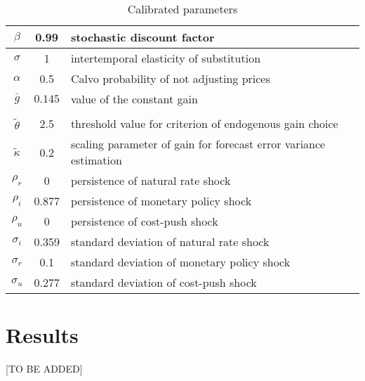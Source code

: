 \documentclass[11pt]{article}
\renewcommand{\[}{\begin{equation}}
\renewcommand{\]}{\end{equation}}
\begin{document}
\begin{center}
\begin{table}
\begin{tabular}{ c | c  | l }
 $\beta$ & 0.99 & stochastic discount factor \\  \hline
 $\sigma$ & 1  & intertemporal elasticity of substitution \\  \hline
 $\alpha$ & 0.5 &  Calvo probability of not adjusting prices \\\hline
 $\bar{g}$ & $0.145$  & value of the constant gain \\\hline
& & \\ [-1em] %
 $\tilde{\theta}$ &  2.5  & threshold value for criterion of endogenous gain choice \\ \hline
  $\tilde{\kappa}$ &  0.2  & scaling parameter of gain for forecast error variance estimation \\ \hline
    $\rho_r$ & 0 &   persistence of natural rate shock \\ \hline
    $\rho_i$ & 0.877 &  persistence of monetary policy shock  \\ \hline
    $\rho_u$ & 0  &  persistence of cost-push shock  \\ \hline
    $\sigma_i$ & 0.359 & standard deviation of natural rate shock  \\ \hline
    $\sigma_r$ &  0.1  &standard deviation of monetary policy shock  \\ \hline
    $\sigma_u$ & 0.277 & standard deviation of cost-push shock   \\ \hline  
\end{tabular}     
      \caption{Calibrated parameters}  \label{calibration}
 \end{table}
\end{center}

\newpage
\section{Results}\label{results_anal}
[TO BE ADDED]

\end{document}
